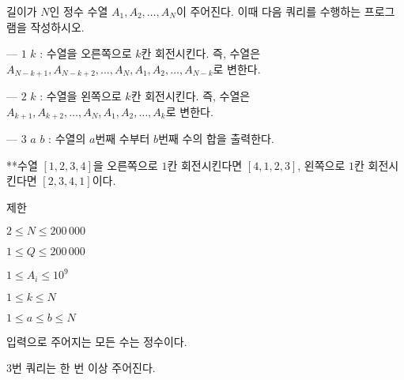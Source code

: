 길이가 $N$인 정수 수열 $A_1,A_2,\dots,A_N$이 주어진다. 이때 다음 쿼리를 수행하는 프로그램을 작성하시오.

--- $1$ $k$ : 수열을 오른쪽으로 $k$칸 회전시킨다. 즉, 수열은 $A_{N-k+1},A_{N-k+2},\dots,A_N,A_1,A_2,\dots,A_{N-k}$로 변한다.

--- $2$ $k$ : 수열을 왼쪽으로 $k$칸 회전시킨다. 즉, 수열은 $A_{k+1},A_{k+2},\dots,A_N,A_1,A_2,\dots,A_{k}$로 변한다.

--- $3$ $a$ $b$ : 수열의 $a$번째 수부터 $b$번째 수의 합을 출력한다.

**수열 $[1,2,3,4]$을 오른쪽으로 $1$칸 회전시킨다면 $[4,1,2,3]$, 왼쪽으로 $1$칸 회전시킨다면 $[2,3,4,1]$이다.


제한

$2 \le N \le 200\,000$

$1 \le Q \le 200\,000$

$1 \le A_i \le 10^9$

$1 \le k \le N$

$1 \le a \le b \le N$

입력으로 주어지는 모든 수는 정수이다.

$3$번 쿼리는 한 번 이상 주어진다.
